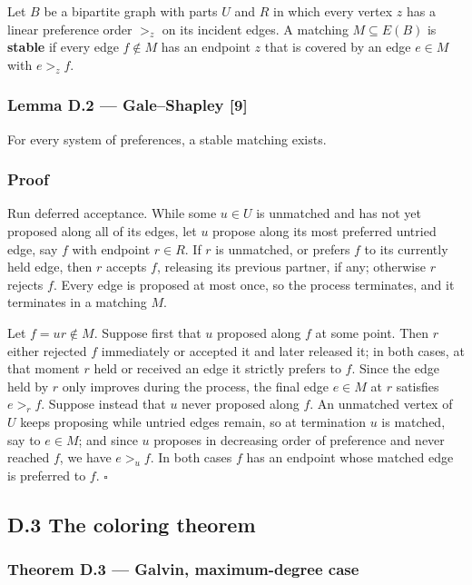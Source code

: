 \documentclass[
  11pt,
]{article}
\begin{document}
Let \(B\) be a bipartite graph with parts \(U\) and \(R\) in which every
vertex \(z\) has a linear preference order \(>_z\) on its incident
edges. A matching \(M\subseteq E(B)\) is \textbf{stable} if every edge
\(f\notin M\) has an endpoint \(z\) that is covered by an edge
\(e\in M\) with \(e>_zf\).

\subsubsection{Lemma D.2 --- Gale--Shapley
{[}9{]}}\label{lemma-d.2-galeshapley-9}

For every system of preferences, a stable matching exists.

\subsubsection{Proof}\label{proof-8}

Run deferred acceptance. While some \(u\in U\) is unmatched and has not
yet proposed along all of its edges, let \(u\) propose along its most
preferred untried edge, say \(f\) with endpoint \(r\in R\). If \(r\) is
unmatched, or prefers \(f\) to its currently held edge, then \(r\)
accepts \(f\), releasing its previous partner, if any; otherwise \(r\)
rejects \(f\). Every edge is proposed at most once, so the process
terminates, and it terminates in a matching \(M\).

Let \(f=ur\notin M\). Suppose first that \(u\) proposed along \(f\) at
some point. Then \(r\) either rejected \(f\) immediately or accepted it
and later released it; in both cases, at that moment \(r\) held or
received an edge it strictly prefers to \(f\). Since the edge held by
\(r\) only improves during the process, the final edge \(e\in M\) at
\(r\) satisfies \(e>_rf\). Suppose instead that \(u\) never proposed
along \(f\). An unmatched vertex of \(U\) keeps proposing while untried
edges remain, so at termination \(u\) is matched, say to \(e\in M\); and
since \(u\) proposes in decreasing order of preference and never reached
\(f\), we have \(e>_uf\). In both cases \(f\) has an endpoint whose
matched edge is preferred to \(f\). \(\square\)

\subsection{D.3 The coloring theorem}\label{d.3-the-coloring-theorem}

\subsubsection{Theorem D.3 --- Galvin, maximum-degree
case}\label{theorem-d.3-galvin-maximum-degree-case}
\end{document}
